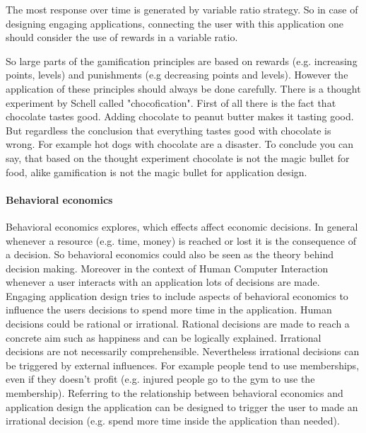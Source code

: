 The most response over time is generated by variable ratio strategy. So in case of designing engaging applications, connecting the user with this application one should consider the use of rewards in a variable ratio. \cite[p. 11]{lewisIrresistibleAppsMotivational2014}

So large parts of the gamification principles are based on rewards (e.g. increasing points, levels) and punishments (e.g decreasing points and levels). However the application of these principles should always be done carefully. There is a thought experiment by Schell called "chocofication". First of all there is the fact that chocolate tastes good. Adding chocolate to peanut butter makes it tasting good. But regardless the conclusion that everything tastes good with chocolate is wrong. For example hot dogs with chocolate are a disaster. 
To conclude you can say, that based on the thought experiment chocolate is not the magic bullet for food, alike gamification is not the magic bullet for application design. \cite[p. 12]{lewisIrresistibleAppsMotivational2014}


\paragraph*{Behavioral economics}

Behavioral economics explores, which effects affect economic decisions. In general whenever a resource (e.g. time, money) is reached or lost it is the consequence of a decision. So behavioral economics could also be seen as the theory behind decision making. Moreover in the context of Human Computer Interaction whenever a user interacts with an application 
lots of decisions are made. Engaging application design tries to include aspects of behavioral economics to influence the users decisions to spend more time in the application. 
Human decisions could be rational or irrational. Rational decisions are made to reach a concrete aim such as happiness and can be logically explained. Irrational decisions are not necessarily comprehensible.  Nevertheless irrational decisions can be triggered by external influences. For example people tend to use memberships, even if they doesn't profit (e.g. injured people go to the gym to use the membership).
Referring to the relationship between behavioral economics and application design the application can be designed to trigger the user to made an irrational decision (e.g. spend more time inside the application than needed). \cite[p. 19]{lewisIrresistibleAppsMotivational2014}



